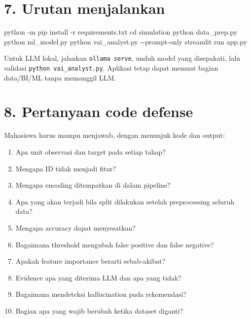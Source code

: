 \documentclass[
  indonesian,
  letterpaper,
  DIV=11,
  numbers=noendperiod]{scrreprt}
\newenvironment{Shaded}{\begin{snugshade}}{\end{snugshade}}
\newcommand{\AttributeTok}[1]{\textcolor[rgb]{0.40,0.45,0.13}{#1}}
\newcommand{\BuiltInTok}[1]{\textcolor[rgb]{0.00,0.23,0.31}{#1}}
\newcommand{\ExtensionTok}[1]{\textcolor[rgb]{0.00,0.23,0.31}{#1}}
\newcommand{\NormalTok}[1]{\textcolor[rgb]{0.00,0.23,0.31}{#1}}
\providecommand{\tightlist}{%
  \setlength{\itemsep}{0pt}\setlength{\parskip}{0pt}}
\begin{document}
\section{7. Urutan menjalankan}\label{urutan-menjalankan}

\begin{Shaded}
\begin{Highlighting}[]
\ExtensionTok{python} \AttributeTok{{-}m}\NormalTok{ pip install }\AttributeTok{{-}r}\NormalTok{ requirements.txt}
\BuiltInTok{cd}\NormalTok{ simulation}
\ExtensionTok{python}\NormalTok{ data\_prep.py}
\ExtensionTok{python}\NormalTok{ ml\_model.py}
\ExtensionTok{python}\NormalTok{ vai\_analyst.py }\AttributeTok{{-}{-}prompt{-}only}
\ExtensionTok{streamlit}\NormalTok{ run app.py}
\end{Highlighting}
\end{Shaded}

Untuk LLM lokal, jalankan \texttt{ollama\ serve}, unduh model yang
disepakati, lalu validasi \texttt{python\ vai\_analyst.py}. Aplikasi
tetap dapat memuat bagian data/BI/ML tanpa memanggil LLM.

\section{8. Pertanyaan code defense}\label{pertanyaan-code-defense}

Mahasiswa harus mampu menjawab, dengan menunjuk kode dan output:

\begin{enumerate}
\def\labelenumi{\arabic{enumi}.}
\tightlist
\item
  Apa unit observasi dan target pada setiap tahap?
\item
  Mengapa ID tidak menjadi fitur?
\item
  Mengapa encoding ditempatkan di dalam pipeline?
\item
  Apa yang akan terjadi bila split dilakukan setelah preprocessing
  seluruh data?
\item
  Mengapa accuracy dapat menyesatkan?
\item
  Bagaimana threshold mengubah false positive dan false negative?
\item
  Apakah feature importance berarti sebab-akibat?
\item
  Evidence apa yang diterima LLM dan apa yang tidak?
\item
  Bagaimana mendeteksi hallucination pada rekomendasi?
\item
  Bagian apa yang wajib berubah ketika dataset diganti?
\end{enumerate}
\end{document}
